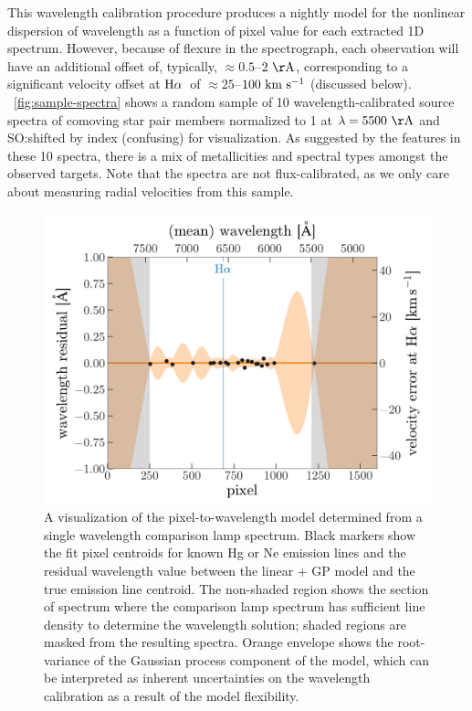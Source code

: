 \documentclass[modern, letterpaper]{aastex61}
\newcommand{\Ha}{\ensuremath{{\rm H}\alpha}}
\newcommand{\smoh}[1]{\textcolor{mediumpersianblue}{SO:#1}}
\begin{document}
This wavelength calibration procedure produces a nightly model for the
nonlinear dispersion of wavelength as a function of pixel value for each
extracted 1D spectrum.
However, because of flexure in the spectrograph, each observation will have an
additional offset of, typically, $\approx 0.5$--$2~{\rm \AA}$, corresponding to
a significant velocity offset at \Ha\ of $\approx 25$--$100~\mathrm{km}~\mathrm{s}^{-1}$ (discussed
below).
\figurename~\ref{fig:sample-spectra} shows a random sample of 10
wavelength-calibrated source spectra of comoving star pair members normalized
to 1 at $\lambda = 5500~{\rm \AA}$ and \smoh{shifted by index (confusing)} for visualization.
As suggested by the features in these 10 spectra, there is a mix of
metallicities and spectral types amongst the observed targets.
Note that the spectra are not flux-calibrated, as we only care about measuring
radial velocities from this sample.

\begin{figure}[htbp]
  \begin{center}
    \includegraphics[width=0.8\linewidth]{wavelength_gp.pdf}
  \end{center}
  \caption{%
    A visualization of the pixel-to-wavelength model determined from a single
    wavelength comparison lamp spectrum.
    Black markers show the fit pixel centroids for known Hg or Ne emission
    lines and the residual wavelength value between the linear + GP model and
    the true emission line centroid.
    The non-shaded region shows the section of spectrum where the comparison
    lamp spectrum has sufficient line density to determine the wavelength
    solution; shaded regions are masked from the resulting spectra.
    Orange envelope shows the root-variance of the Gaussian process component
    of the model, which can be interpreted as inherent uncertainties on the
    wavelength calibration as a result of the model flexibility.
    \label{fig:wavelength-GP}}
\end{figure}
\end{document}
